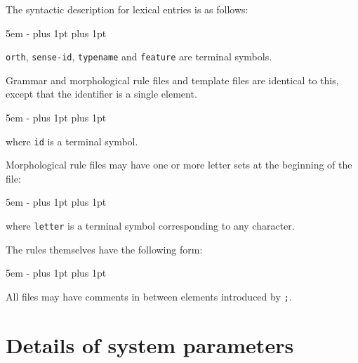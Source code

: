 \documentclass[12pt]{report}
\begin{document}
The syntactic description for lexical entries is as follows:
\begin{list}{}
   {\leftmargin 5em
    \itemindent -\leftmargin
    \itemsep 0pt plus 1pt
    \parsep 0pt plus 1pt}
\end{list}
{\tt orth}, {\tt sense-id},
{\tt typename} and {\tt feature} are 
terminal symbols.

Grammar and morphological rule files 
and template files are identical to this, 
except that the identifier is a single element.
\begin{list}{}
   {\leftmargin 5em
    \itemindent -\leftmargin
    \itemsep 0pt plus 1pt
    \parsep 0pt plus 1pt}
\end{list}
where {\tt id} is a terminal symbol.

Morphological rule files may have one or more letter sets at the 
beginning of the file:
\begin{list}{}
   {\leftmargin 5em
    \itemindent -\leftmargin
    \itemsep 0pt plus 1pt
    \parsep 0pt plus 1pt}
\end{list}
where {\tt letter} is a terminal symbol corresponding to any character.

The rules themselves have the following form:
\begin{list}{}
   {\leftmargin 5em
    \itemindent -\leftmargin
    \itemsep 0pt plus 1pt
    \parsep 0pt plus 1pt}
\end{list}

All files may have comments in between elements introduced by {\tt ;}.


\chapter{Details of system parameters}
\label{glob}
\end{document}
